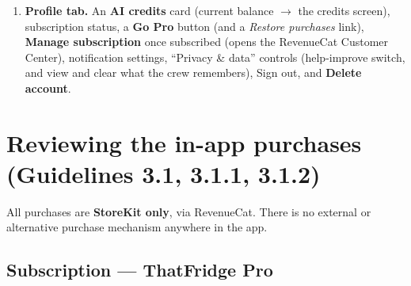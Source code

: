 \documentclass[11pt]{article}
\begin{document}
\begin{enumerate}
        approve join requests. Content in a fridge is visible only to approved members.
        Hosting a shared fridge requires Pro; being invited to one is free. The demo account
        has Pro, so all of this is available.
  \item \textbf{Profile tab.} An \textbf{AI credits} card (current balance $\rightarrow$
        the credits screen), subscription status, a \textbf{Go Pro} button (and a
        \emph{Restore purchases} link), \textbf{Manage subscription} once subscribed (opens
        the RevenueCat Customer Center), notification settings, ``Privacy \& data''
        controls (help-improve switch, and view and clear what the crew remembers), Sign out, and \textbf{Delete
        account}.
\end{enumerate}

\section{Reviewing the in-app purchases (Guidelines 3.1, 3.1.1, 3.1.2)}
\label{sec:iap}

All purchases are \textbf{StoreKit only}, via RevenueCat. There is no external or
alternative purchase mechanism anywhere in the app.

\subsection{Subscription --- ThatFridge Pro}
\end{document}
